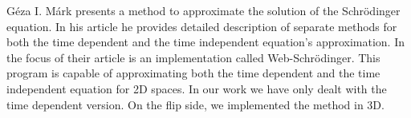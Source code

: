 Géza I. Márk \cite{mark2020webschrodinger} presents a method to approximate the solution of the Schrödinger equation.
In his article he provides detailed description of separate methods for both the time dependent and the time independent equation's approximation.
In the focus of their article is an implementation called Web-Schrödinger.
This program is capable of approximating both the time dependent and the time independent equation for 2D spaces.
In our work we have only dealt with the time dependent version.
On the flip side, we implemented the method in 3D.





